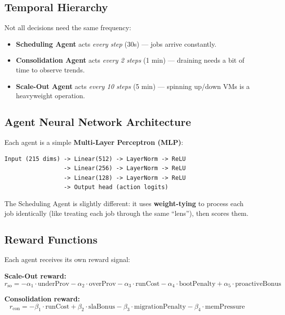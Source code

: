 \documentclass[11pt,a4paper]{article}
\begin{document}
\subsection{Temporal Hierarchy}

Not all decisions need the same frequency:
\begin{itemize}[leftmargin=2em]
  \item \textbf{Scheduling Agent} acts \textit{every step} (30s) --- jobs arrive
        constantly.
  \item \textbf{Consolidation Agent} acts \textit{every 2 steps} (1 min) ---
        draining needs a bit of time to observe trends.
  \item \textbf{Scale-Out Agent} acts \textit{every 10 steps} (5 min) ---
        spinning up/down VMs is a heavyweight operation.
\end{itemize}

\subsection{Agent Neural Network Architecture}

Each agent is a simple \textbf{Multi-Layer Perceptron (MLP)}:

\begin{lstlisting}
Input (215 dims) -> Linear(512) -> LayerNorm -> ReLU
                 -> Linear(256) -> LayerNorm -> ReLU
                 -> Linear(128) -> LayerNorm -> ReLU
                 -> Output head (action logits)
\end{lstlisting}

The Scheduling Agent is slightly different: it uses \textbf{weight-tying} to
process each job identically (like treating each job through the same ``lens''),
then scores them.

\subsection{Reward Functions}

Each agent receives its own reward signal:

\medskip
\noindent\textbf{Scale-Out reward:}
\[
  r_{\text{so}} = -\alpha_1 \cdot \text{underProv} - \alpha_2 \cdot \text{overProv}
                  - \alpha_3 \cdot \text{runCost} - \alpha_4 \cdot \text{bootPenalty}
                  + \alpha_5 \cdot \text{proactiveBonus}
\]

\noindent\textbf{Consolidation reward:}
\[
  r_{\text{con}} = -\beta_1 \cdot \text{runCost} + \beta_2 \cdot \text{slaBonus}
                   - \beta_3 \cdot \text{migrationPenalty} - \beta_4 \cdot \text{memPressure}
\]
\end{document}
